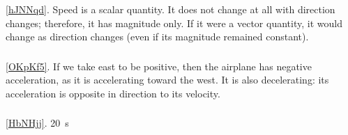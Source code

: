 \documentclass[main-ap-physics.tex]{subfiles}
\begin{document}
\subsubsection*{} %

\ref{hJNNqd}. Speed is a scalar quantity. It does not change at all with direction changes; therefore, it has magnitude only. If it were a vector quantity, it would change as direction changes (even if its magnitude remained constant).\\

\subsubsection*{} %

\ref{OKpKf5}. If we take east to be positive, then the airplane has negative acceleration, as it is accelerating toward the west. It is also decelerating: its acceleration is opposite in direction to its velocity.\\

\subsubsection*{} %
\ref{HbNHjj}. \SI{20}{s}\\
\end{document}
